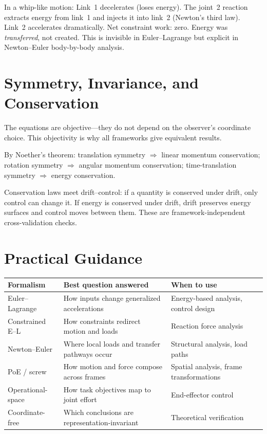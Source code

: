 \documentclass[11pt]{article}
\begin{document}
In a whip-like motion: Link~1 decelerates (loses energy). The joint~2 reaction extracts energy from link~1 and injects it into link~2 (Newton's third law). Link~2 accelerates dramatically. Net constraint work: zero. Energy was \emph{transferred}, not created. This is invisible in Euler--Lagrange but explicit in Newton--Euler body-by-body analysis.


\section{Symmetry, Invariance, and Conservation}\label{sec:symmetry}

The equations are objective---they do not depend on the observer's coordinate choice. This objectivity is why all frameworks give equivalent results.

By Noether's theorem: translation symmetry $\Rightarrow$ linear momentum conservation; rotation symmetry $\Rightarrow$ angular momentum conservation; time-translation symmetry $\Rightarrow$ energy conservation.

Conservation laws meet drift--control: if a quantity is conserved under drift, only control can change it. If energy is conserved under drift, drift preserves energy surfaces and control moves between them. These are framework-independent cross-validation checks.


\section{Practical Guidance}\label{sec:practical}

\begin{center}
\small
\renewcommand{\arraystretch}{1.2}
\begin{tabularx}{\textwidth}{>{\raggedright\arraybackslash}p{3.1cm}Y Y}
\toprule
Formalism & Best question answered & When to use \\
\midrule
Euler--Lagrange & How inputs change generalized accelerations & Energy-based analysis, control design \\
\midrule
Constrained E--L & How constraints redirect motion and loads & Reaction force analysis \\
\midrule
Newton--Euler & Where local loads and transfer pathways occur & Structural analysis, load paths \\
\midrule
PoE / screw & How motion and force compose across frames & Spatial analysis, frame transformations \\
\midrule
Operational-space & How task objectives map to joint effort & End-effector control \\
\midrule
Coordinate-free & Which conclusions are representation-invariant & Theoretical verification \\
\bottomrule
\end{tabularx}
\end{center}
\end{document}
